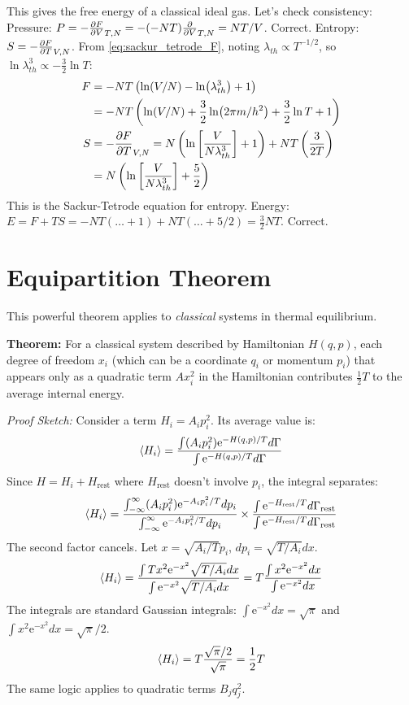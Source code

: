 \documentclass[10pt, letterpaper]{article}
\newcommand{\avg}[1]{\expval{#1}} %
\newcommand{\mathe}{\mathrm{e}} %
\begin{document}
This gives the free energy of a classical ideal gas. Let's check consistency:
Pressure: $P = -\pdv{F}{V}_{T,N} = - (-NT) \pdv{}{V} (\ln V + \dots)_{T,N} = NT/V$. Correct.
Entropy: $S = -\pdv{F}{T}_{V,N}$. From \eqref{eq:sackur_tetrode_F}, noting $\lambda_{th} \propto T^{-1/2}$, so $\ln \lambda_{th}^3 \propto -\frac{3}{2} \ln T$:
\begin{align*}
 F &= -NT \left( \ln(V/N) - \ln(\lambda_{th}^3) + 1 \right) \\
   &= -NT \left( \ln(V/N) + \frac{3}{2} \ln(2 \pi m / h^2) + \frac{3}{2} \ln T + 1 \right) \\
 S &= -\pdv{F}{T}_{V,N} = N \left( \ln \left[ \frac{V}{N \lambda_{th}^3} \right] + 1 \right) + NT \left( \frac{3}{2T} \right) \\
   &= N \left( \ln \left[ \frac{V}{N \lambda_{th}^3} \right] + \frac{5}{2} \right)
\end{align*}
This is the Sackur-Tetrode equation for entropy.
Energy: $E = F+TS = -NT(\dots + 1) + NT(\dots + 5/2) = \frac{3}{2} NT$. Correct.

\section{Equipartition Theorem}
This powerful theorem applies to \textit{classical} systems in thermal equilibrium.

\textbf{Theorem:} For a classical system described by Hamiltonian $H(q,p)$, each degree of freedom $x_i$ (which can be a coordinate $q_i$ or momentum $p_i$) that appears only as a quadratic term $A x_i^2$ in the Hamiltonian contributes $\frac{1}{2}T$ to the average internal energy.

\textit{Proof Sketch:} Consider a term $H_i = A_i p_i^2$. Its average value is:
\begin{equation*}
    \avg{H_i} = \frac{\int (A_i p_i^2) \mathe^{-H(q,p)/T} d\Gamma}{\int \mathe^{-H(q,p)/T} d\Gamma}
\end{equation*}
Since $H = H_i + H_{\text{rest}}$ where $H_{\text{rest}}$ doesn't involve $p_i$, the integral separates:
\begin{equation*}
    \avg{H_i} = \frac{\int_{-\infty}^{\infty} (A_i p_i^2) \mathe^{-A_i p_i^2 / T} dp_i}{\int_{-\infty}^{\infty} \mathe^{-A_i p_i^2 / T} dp_i} \times \frac{\int \mathe^{-H_{\text{rest}}/T} d\Gamma_{\text{rest}}}{\int \mathe^{-H_{\text{rest}}/T} d\Gamma_{\text{rest}}}
\end{equation*}
The second factor cancels. Let $x = \sqrt{A_i/T} p_i$, $dp_i = \sqrt{T/A_i} dx$.
\begin{equation*}
    \avg{H_i} = \frac{\int T x^2 \mathe^{-x^2} \sqrt{T/A_i} dx}{\int \mathe^{-x^2} \sqrt{T/A_i} dx} = T \frac{\int x^2 \mathe^{-x^2} dx}{\int \mathe^{-x^2} dx}
\end{equation*}
The integrals are standard Gaussian integrals: $\int \mathe^{-x^2} dx = \sqrt{\pi}$ and $\int x^2 \mathe^{-x^2} dx = \sqrt{\pi}/2$.
\begin{equation*}
    \avg{H_i} = T \frac{\sqrt{\pi}/2}{\sqrt{\pi}} = \frac{1}{2}T
\end{equation*}
The same logic applies to quadratic terms $B_j q_j^2$.
\end{document}

